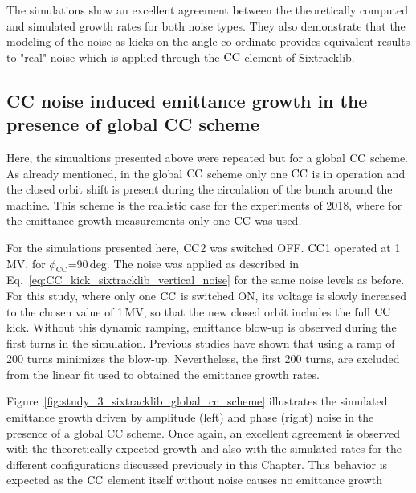 The simulations show an excellent agreement between the theoretically computed and simulated growth rates for both noise types. They also demonstrate that the modeling of the noise as kicks on the angle co-ordinate provides equivalent results to "real" noise which is applied through the ${\mathrm{CC}}$ element of Sixtracklib.

\subsection{CC noise induced emittance growth in the presence of global CC scheme}\label{subsec:global_CC_sixtracklib}
Here, the simualtions presented above were repeated but for a global ${\mathrm{CC}}$ scheme. As already mentioned, in the global ${\mathrm{CC}}$ scheme only one ${\mathrm{CC}}$ is in operation and the closed orbit shift is present during the circulation of the bunch around the machine. This scheme is the realistic case for the experiments of 2018, where for the emittance growth measurements only one ${\mathrm{CC}}$ was used.

For the simulations presented here, ${\mathrm{CC}}$2 was switched OFF. ${\mathrm{CC}}$1 operated at 1\,MV, for $\phi_\mathrm{CC}$=90\,deg. The noise was applied as described in Eq.~\eqref{eq:CC_kick_sixtracklib_vertical_noise} for the same noise levels as before. For this study, where only one ${\mathrm{CC}}$ is switched ON, its voltage is slowly increased to the chosen value of 1\,MV, so that the new closed orbit includes the full ${\mathrm{CC}}$ kick. Without this dynamic ramping, emittance blow-up is observed during the first turns in the simulation. Previous studies have shown that using a ramp of 200 turns minimizes the blow-up.
Nevertheless, the first 200 turns, are excluded from the linear fit used to obtained the emittance growth rates. %

Figure~\ref{fig:study_3_sixtracklib_global_cc_scheme} illustrates the simulated emittance growth driven by amplitude (left) and phase (right) noise in the presence of a global CC scheme. Once again, an excellent agreement is observed with the theoretically expected growth and also with the simulated rates for the different configurations discussed previously in this Chapter. This behavior is expected as the ${\mathrm{CC}}$ element itself without noise causes no emittance growth %

